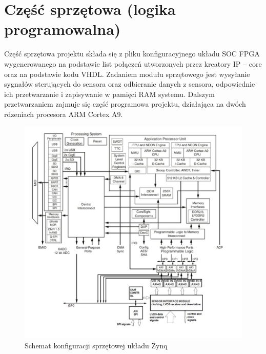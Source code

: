 \documentclass[a4paper,11pt,oneside]{report}  %
\begin{document}
\section{Część sprzętowa (logika programowalna)}
Część sprzętowa projektu składa się z pliku konfiguracyjnego układu SOC FPGA wygenerowanego na podstawie list połączeń utworzonych przez kreatory IP – core oraz na podstawie kodu VHDL. Zadaniem modułu sprzętowego jest wysyłanie sygnałów sterujących do sensora oraz odbieranie danych z sensora, odpowiednie ich przetwarzanie i zapisywanie w pamięci RAM systemu. Dalszym przetwarzaniem zajmuje się część programowa projektu, działająca na dwóch rdzeniach procesora ARM Cortex A9.

\begin{figure}[H]
	\centering
	\includegraphics[width=13cm]{fpga.png}
	\caption{Schemat konfiguracji sprzętowej układu Zynq}
	\label{fig:Zynq}
\end{figure}
\end{document}
